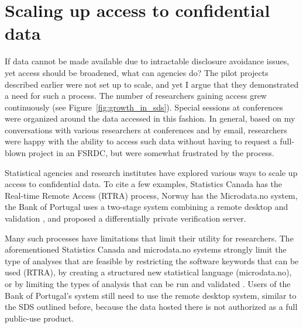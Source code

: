 \documentclass[inline]{hdsr}
\begin{document}
\section{Scaling up access to confidential data}

If data cannot be made available due to intractable disclosure avoidance issues, yet access should be broadened, what can agencies do? 
The pilot projects described earlier were not set up to scale, and yet I argue that  they demonstrated  a need for such a process. The number of researchers gaining access grew continuously (see Figure~\ref{fig:growth_in_sds}). Special sessions at conferences were organized around the data accessed in this fashion. In general, based on my conversations with various researchers at conferences and by email, researchers were happy with the ability to access such data without having to request a full-blown project in an \ac{FSRDC}, but were somewhat frustrated by the process. 


Statistical agencies and research institutes have explored various ways to scale up access to confidential data. To cite a few examples, Statistics Canada has the Real-time Remote Access (RTRA) process, Norway has the Microdata.no system, the Bank of Portugal uses a two-stage system combining a remote desktop and validation \citep{guimaraes_reproducibility_2023}, and \citet{barrientos_providing_2018} proposed a differentially private verification server. 

Many such processes have limitations that limit their utility for researchers. The aforementioned Statistics Canada and microdata.no systems strongly limit the type of analyses that are feasible by restricting the software keywords that can be used (RTRA), by creating a structured new statistical language (microdata.no), or by limiting the types of analysis that can be run and validated \citep{barrientos_providing_2018}. Users of the Bank of Portugal's system still need to use the remote desktop system, similar to the SDS outlined before, because the data hosted there is not authorized as a full public-use product.
\end{document}

